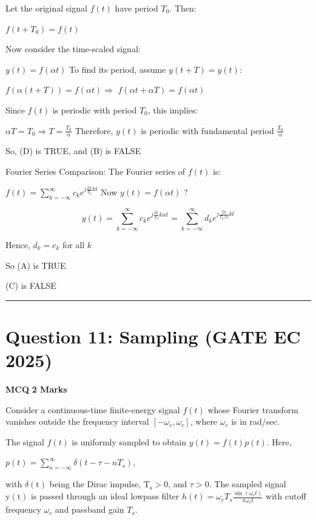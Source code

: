 \documentclass[11pt,a4paper]{article}
\begin{document}
\begin{tcolorbox}[solbox, title=Detailed Solution -- Question 10]
Let the original signal $f(t)$ have period $T_0$. Then:

$f(t + T_0) = f(t)$

Now consider the time-scaled signal:

$y(t) = f(\alpha t)$
To find its period, assume $y(t + T) = y(t)$:

$f(\alpha(t + T)) = f(\alpha t) \Rightarrow$  $f(\alpha t + \alpha T) = f(\alpha t)$

Since $f(t)$ is periodic with period $T_0$, this implies:

$\alpha T = T_0 \Rightarrow T = \frac{T_0}{\alpha}$
Therefore, $y(t)$ is periodic with fundamental period $\frac{T_0}{\alpha}$

So, (D) is TRUE, and (B) is FALSE

Fourier Series Comparison:
The Fourier series of $f(t)$ is:

$f(t) = \sum_{k=-\infty}^{\infty} c_k e^{j \frac{2\pi}{T_0}kt}$
Now $y(t) = f(\alpha t)$ ?

\[
y(t) = \sum_{k=-\infty}^{\infty} c_k e^{j \frac{2\pi}{T_0}k \alpha t} = \sum_{k=-\infty}^{\infty} d_k e^{j \frac{2\pi}{T_0/\alpha}k t}
\]

Hence, $d_k = c_k$ for all $k$

So (A) is TRUE

(C) is FALSE
\end{tcolorbox}

\vspace{1.5em}
\hrule
\vspace{1.5em}

\section*{Question 11: Sampling (GATE EC 2025)}
\noindent \textbf{\color{primary}MCQ} \hfill \textbf{\color{secondary}2 Marks}


\noindent Consider a continuous-time finite-energy signal $f(t)$ whose Fourier transform vanishes outside the frequency interval $\left[-\omega_{c}, \omega_{c}\right]$, where $\omega_{c}$ is in rad/sec. 

The signal $f(t)$ is uniformly sampled to obtain $y(t)=f(t) p(t)$. Here, 

$p(t)=\sum_{n=-\infty}^{\infty} \delta\left(t-\tau-n T_{s}\right)$,

 with $\delta(\mathrm{t})$ being the Dirac impulse, $\mathrm{T}_{\mathrm{s}}>0$, and $\tau>0$. The sampled signal $\mathrm{y}(\mathrm{t})$ is passed through an ideal lowpass filter $h(t)=\omega_{c} T_{s} \frac{\sin \left(\omega_{c} t\right)}{\pi \omega_{c} t}$ with cutoff frequency $\omega_{c}$ and passband gain $T_{s}$. 
\end{document}
